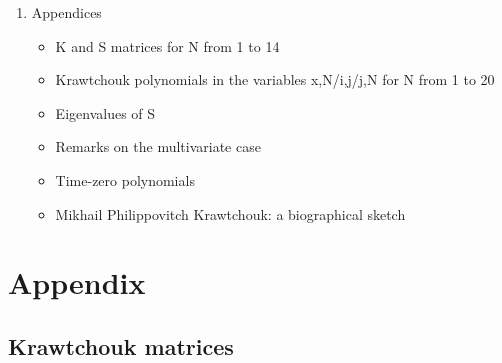 \documentclass[12pt]{article}
\numberwithin{equation}{section}
\begin{document}
\begin{enumerate}
\item Appendices  

\begin{itemize}
\item  K and S matrices for N from 1 to 14 
\item  Krawtchouk polynomials in the variables x,N/i,j/j,N for N from 1 to 20 
\item  Eigenvalues of S 
\item  Remarks on the multivariate case 
\item  Time-zero polynomials 
\item  Mikhail Philippovitch Krawtchouk: a biographical sketch 
\end{itemize}

\end{enumerate}

\pagestyle{empty}
\section{Appendix}
%
\subsection{Krawtchouk matrices}
\end{document}
